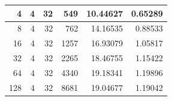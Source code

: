 \documentclass[journal,transmag]{IEEEtran}
\begin{document}
\begin{table}[h]
\begin{tabular}{|r|r|r|r|r|r|}
		4                             & 4                          & 32                               & 549                            & 10.44627                      & 0.65289                         \\ \hline
		8                             & 4                          & 32                               & 762                            & 14.16535                      & 0.88533                         \\ \hline
		16                            & 4                          & 32                               & 1257                           & 16.93079                      & 1.05817                         \\ \hline
		32                            & 4                          & 32                               & 2265                           & 18.46755                      & 1.15422                         \\ \hline
		64                            & 4                          & 32                               & 4340                           & 19.18341                      & 1.19896                         \\ \hline
		128                           & 4                          & 32                               & 8681                           & 19.04677                      & 1.19042                         \\ \hline
	\end{tabular}
\end{table}
	\newpage
	
\end{document}
